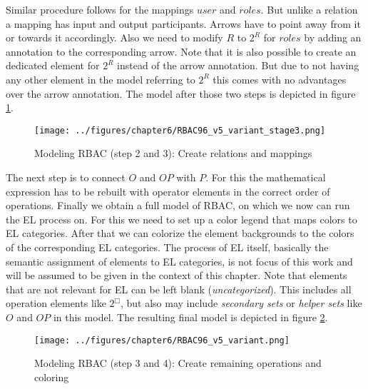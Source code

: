 \documentclass[twoside, openright, 12pt]{book}
\begin{document}
%
Similar procedure follows for the mappings $user$ and $roles$.
But unlike a relation a mapping has input and output participants.
Arrows have to point away from it or towards it accordingly.
Also we need to modify $R$ to $2^R$ for $roles$ by adding an annotation to the corresponding arrow.
Note that it is also possible to create an dedicated element for $2^R$ instead of the arrow annotation.
But due to not having any other element in the model referring to $2^R$ this comes with no advantages over the arrow annotation.
The model after those two steps is depicted in figure \ref{fig:RBAC96_v5_variant_stage3}.

\begin{figure}[htb]
	\centering
	\texttt{[image: ../figures/chapter6/RBAC96\_v5\_variant\_stage3.png]}
	\caption{Modeling RBAC (step 2 and 3): Create relations and mappings}
	\label{fig:RBAC96_v5_variant_stage3}
\end{figure}

\noindent
The next step is to connect $O$ and $\mathit{OP}$ with $P$.
For this the mathematical expression has to be rebuilt with operator elements in the correct order of operations.
Finally we obtain a full model of RBAC, on which we now can run the EL process on.
For this we need to set up a color legend that maps colors to EL categories.
After that we can colorize the element backgrounds to the colors of the corresponding EL categories.
The process of EL itself, basically the semantic assignment of elements to EL categories, is not focus of this work and will be assumed to be given in the context of this chapter.
Note that elements that are not relevant for EL can be left blank (\textit{uncategorized}).
This includes all operation elements like $2^{\Box}$, but also may include \textit{secondary sets} or \textit{helper sets} like $O$ and $\mathit{OP}$ in this model.
The resulting final model is depicted in figure \ref{fig:RBAC96_v5_variant}.

\begin{figure}[htb]
	\centering
	\texttt{[image: ../figures/chapter6/RBAC96\_v5\_variant.png]}
	\caption{Modeling RBAC (step 3 and 4): Create remaining operations and coloring}
	\label{fig:RBAC96_v5_variant}
\end{figure}
\end{document}
